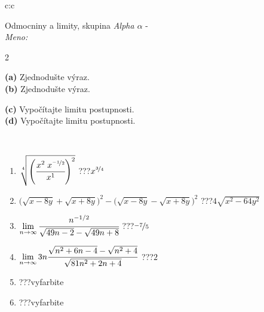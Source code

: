 \documentclass[10pt]{report}
\begin{document}
\thispagestyle{empty}
\begin{tabular}{c:c}
\begin{minipage}[c][104.5mm][t]{0.5\linewidth}
\begin{center}
\vspace{7mm}
{\huge Odmocniny a limity, skupina \textit{Alpha $\alpha$} -}\\[5mm]
\textit{Meno:}\phantom{xxxxxxxxxxxxxxxxxxxxxxxxxxxxxxxxxxxxxxxxxxxxxxxxxxxxxxxxxxxxxxxxx}\\[5mm]
\begin{minipage}{0.95\linewidth}
\begin{center}
{\small \begin{multicols}{2} \raggedright
\textbf{(a)} Zjednodušte výraz. \\[1mm]
\textbf{(b)} Zjednodušte výraz. \par \columnbreak
\textbf{(c)} Vypočítajte limitu postupnosti. \\[1mm]
\textbf{(d)} Vypočítajte limitu postupnosti.
\end{multicols}
}
\end{center}
\end{minipage}
\\[4mm]
\begin{minipage}{0.79\linewidth}
\begin{center}
\begin{varwidth}{\linewidth}
\begin{enumerate}
\small
\item $\sqrt[4]{\left(\cfrac{x^{2}\;x^{\nicefrac{-1}{2}}}{x^{1}}\right)^{2}}$\quad \dotfill\; ???\;\dotfill \quad $x^{\nicefrac{3}{4}}$
\item {\footnotesize{\scriptsize$\big(\sqrt{x-8y}+\sqrt{x+8y}\big)^2-\big(\sqrt{x-8y}-\sqrt{x+8y}\big)^2$}\quad \dotfill\; ???\;\dotfill \quad $4\sqrt{x^2-64y^2}$}
\item $\lim\limits_{n\to\infty}\cfrac{n^{-1/2}}{\sqrt{49n-2}-\sqrt{49n+8}}$\quad \dotfill\; ???\;\dotfill \quad $\nicefrac{-7}{5}$
\item $\lim\limits_{n\to\infty}3n\cfrac{\sqrt{n^2+6n-4}-\sqrt{n^2+4}}{\sqrt{81n^2+2n+4}}$\quad \dotfill\; ???\;\dotfill \quad $2$
\item \quad \dotfill\; ???\;\dotfill \quad vyfarbite
\item \quad \dotfill\; ???\;\dotfill \quad vyfarbite
\end{enumerate}
\end{varwidth}
\end{center}

\end{minipage}
\end{center}
\end{minipage}
\end{tabular}
\end{document}
